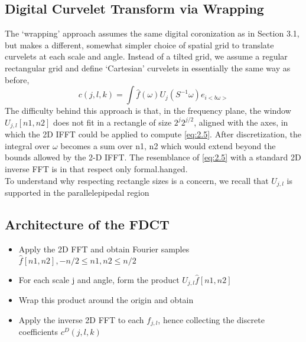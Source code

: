 \subsection{Digital Curvelet Transform via Wrapping} 
The ‘wrapping’ approach assumes the same digital coronization as in Section 3.1, but makes a different, somewhat simpler choice of spatial grid to translate curvelets at each scale and angle. Instead of a tilted grid, we assume a regular rectangular grid and define ‘Cartesian’ curvelets in essentially the same way as before,
\begin{equation} \label{eq:2.5}
 c\left(j,l,k \right)=\int \hat{f}\left(\omega  \right){U}_{j}\left({S}^{-1}\omega  \right){e}_{i<b\omega> }
\end{equation}
The difficulty behind this approach is that, in the frequency plane, the window \({U}_{j,l}\left[n1,n2 \right] \) does not
fit in a rectangle of size \({2}^{j} {2}^{j/2}  \), aligned with the axes, in which the 2D IFFT could be applied to compute \ref{eq:2.5}. After discretization, the integral over \(\omega \) becomes a sum over n1, n2 which would extend beyond the bounds allowed by the 2-D IFFT. The resemblance of \ref{eq:2.5} with a standard 2D inverse FFT is in that respect only formal.hanged.\\

To understand why respecting rectangle sizes is a concern, we recall that \({U}_{j,l}\)  is supported in the parallelepipedal region
    
 \subsection{Architecture of the FDCT}   
 
 \begin{itemize}
  \item Apply the 2D FFT and obtain Fourier samples \( \hat{f}\left[n1,n2 \right],-n/2 \leq n1,n2 \leq n/2   \)
  \item  For each scale j and angle, form the product \({U}_{j,l} \hat{f}\left[n1,n2\right] \)
  \item  Wrap this product around the origin and obtain
  \item  Apply the inverse 2D FFT to each \({f}_{j,l} \), hence collecting the discrete coefficients \({c}^{D} \left(j,l,k\right) \)
\end{itemize}